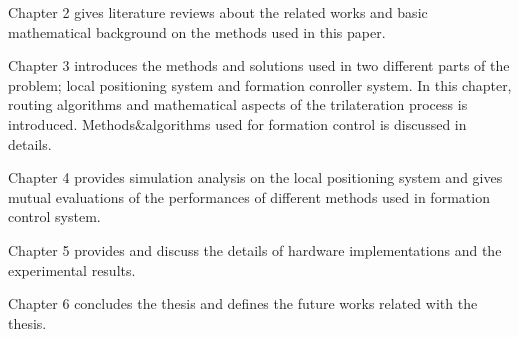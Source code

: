 Chapter 2 gives literature reviews about the related works and basic mathematical background on the methods used in this paper.

Chapter 3 introduces the methods and solutions used in two different parts of the problem; local positioning system and formation conroller system. In this chapter, routing algorithms and mathematical aspects of the trilateration process is introduced. Methods$\&$algorithms used for formation control is discussed in details.

Chapter 4 provides simulation analysis on the local positioning system and gives mutual evaluations of the performances of different methods used in formation control system.

Chapter 5 provides and discuss the details of hardware implementations and the experimental results.

Chapter 6 concludes the thesis and defines the future works related with the thesis.